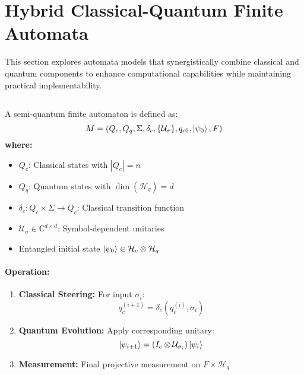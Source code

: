 \section{Hybrid Classical-Quantum Finite Automata}
\label{sec:hybrid-qfa}

This section explores automata models that synergistically combine classical and quantum components to enhance computational capabilities while maintaining practical implementability.

\subsection{}
\label{subsec:sqa}

\begin{definition}
A semi-quantum finite automaton is defined as:
\[
M = (Q_c, Q_q, \Sigma, \delta_c, \{\mathcal{U}_\sigma\}, q_{c0}, \ket{\psi_0}, F)
\]
\textbf{where:}
\begin{itemize}
    \item $Q_c$: Classical states with $|Q_c| = n$
    \item $Q_q$: Quantum states with $\dim(\mathcal{H}_q) = d$
    \item $\delta_c: Q_c \times \Sigma \rightarrow Q_c$: Classical transition function
    \item $\mathcal{U}_\sigma \in \mathbb{C}^{d \times d}$: Symbol-dependent unitaries
    \item Entangled initial state $\ket{\psi_0} \in \mathcal{H}_c \otimes \mathcal{H}_q$
\end{itemize}
\end{definition}

\paragraph{Operation:}
\begin{enumerate}
    \item \textbf{Classical Steering:} For input $\sigma_i$:
    \[
    q_c^{(i+1)} = \delta_c(q_c^{(i)}, \sigma_i)
    \]
    \item \textbf{Quantum Evolution:} Apply corresponding unitary:
    \[
    \ket{\psi_{i+1}} = (I_c \otimes \mathcal{U}_{\sigma_i}) \ket{\psi_i}
    \]
    \item \textbf{Measurement:} Final projective measurement on $F \times \mathcal{H}_q$
\end{enumerate}

